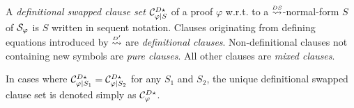 \begin{definition}
\label{definition:CutPertinentClauseSetSwappeDefinitional}
A \emph{definitional swapped clause set} $\mathcal{C}^{D\star}_{\varphi|S}$ of a proof $\varphi$ w.r.t. to a $\normalizePlusTimesSD$-normal-form $S$ of $\mathcal{S}_{\varphi}$ is $S$ written in sequent notation.
Clauses originating from defining equations introduced by $\normalizePlusTimesSDd$ are \emph{definitional clauses}. Non-definitional clauses not containing new symbols are \emph{pure clauses}. All other clauses are \emph{mixed clauses}.
\end{definition}

\begin{remark}
In cases where $\mathcal{C}^{D\star}_{\varphi|S_1} = \mathcal{C}^{D\star}_{\varphi|S_2}$ for any $S_1$ and $S_2$, the unique definitional swapped clause set is denoted simply as $\mathcal{C}^{D\star}_{\varphi}$.
\end{remark}



